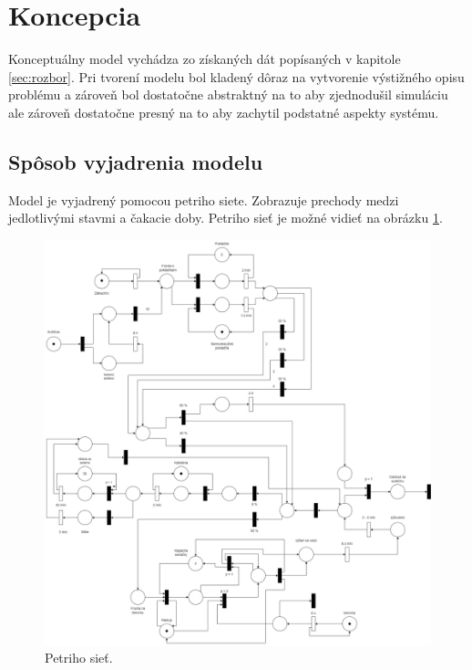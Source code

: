 \section{Koncepcia}
Konceptuálny model vychádza zo získaných dát popísaných v kapitole \ref{sec:rozbor}. Pri tvorení modelu bol kladený dôraz
na vytvorenie výstižného opisu problému a zároveň bol dostatočne abstraktný na to aby zjednodušil simuláciu ale zároveň dostatočne presný na to aby zachytil podstatné aspekty systému. 

\subsection{Spôsob vyjadrenia modelu}
Model je vyjadrený pomocou petriho siete. Zobrazuje prechody medzi jedlotlivými stavmi a čakacie doby. Petriho sieť je možné vidieť na obrázku \ref{fig:petri}.

\begin{figure}[H]
    \centering
    \includegraphics[width=1\textwidth]{petriho-siet.png}
    \caption{Petriho sieť.}
    \label{fig:petri}
  \end{figure}

